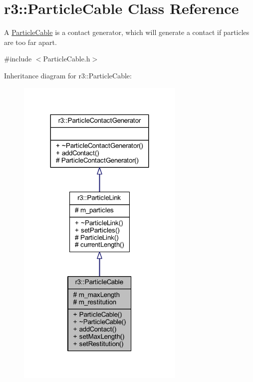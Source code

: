 \hypertarget{classr3_1_1_particle_cable}{}\section{r3\+:\+:Particle\+Cable Class Reference}
\label{classr3_1_1_particle_cable}


A \mbox{\hyperlink{classr3_1_1_particle_cable}{Particle\+Cable}} is a contact generator, which will generate a contact if particles are too far apart.  




{\ttfamily \#include $<$Particle\+Cable.\+h$>$}



Inheritance diagram for r3\+:\+:Particle\+Cable\+:\nopagebreak
\begin{figure}[H]
\begin{center}
\leavevmode
\includegraphics[width=227pt]{classr3_1_1_particle_cable__inherit__graph}
\end{center}
\end{figure}


